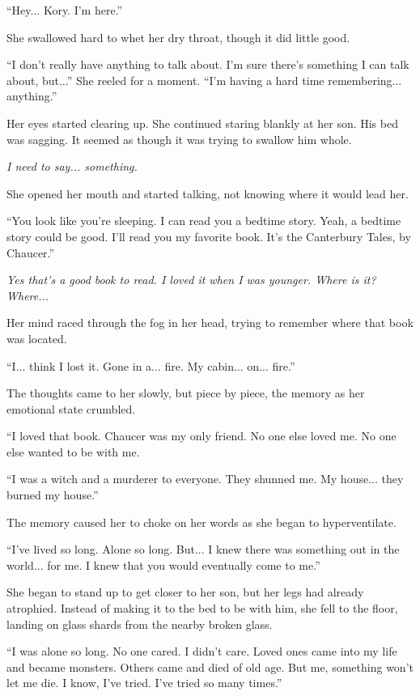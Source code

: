``Hey... Kory. I'm here.''

She swallowed hard to whet her dry throat, though it did little good.

``I don't really have anything to talk about. I'm sure there's something I can talk about, but...'' She reeled for a moment. ``I'm having a hard time remembering... anything.''

Her eyes started clearing up. She continued staring blankly at her son. His bed was sagging. It seemed as though it was trying to swallow him whole.

\textit{I need to say... something.}

She opened her mouth and started talking, not knowing where it would lead her.

``You look like you're sleeping. I can read you a bedtime story. Yeah, a bedtime story could be good. I'll read you my favorite book. It's the Canterbury Tales, by Chaucer.''

\textit{Yes that's a good book to read. I loved it when I was younger. Where is it? Where...}

Her mind raced through the fog in her head, trying to remember where that book was located.

``I... think I lost it. Gone in a... fire. My cabin... on... fire.''

The thoughts came to her slowly, but piece by piece, the memory as her emotional state crumbled.

``I loved that book. Chaucer was my only friend. No one else loved me. No one else wanted to be with me.

``I was a witch and a murderer to everyone. They shunned me. My house... they burned my house.''

The memory caused her to choke on her words as she began to hyperventilate.

``I've lived so long. Alone so long. But... I knew there was something out in the world... for me. I knew that you would eventually come to me.''

She began to stand up to get closer to her son, but her legs had already atrophied. Instead of making it to the bed to be with him, she fell to the floor, landing on glass shards from the nearby broken glass.

``I was alone so long. No one cared. I didn't care. Loved ones came into my life and became monsters. Others came and died of old age. But me, something won't let me die. I know, I've tried. I've tried so many times.''

